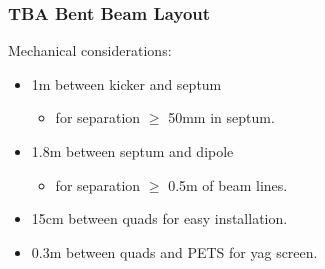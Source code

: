 \documentclass[professionalfonts,t]{beamer}
\begin{document}
\begin{frame}
	\frametitle{TBA Bent Beam Layout}
	\begin{tikzpicture}[scale=\textwidth/22cm, text=black]
	
	\end{tikzpicture}
	
	\vspace{-1em}
	Mechanical considerations:
	\begin{itemize}
		\item 1m between kicker and septum
		\begin{itemize}
			\item for separation $\ge$ 50mm in septum. 
		\end{itemize}
		\item 1.8m between septum and dipole
		\begin{itemize}
			\item for separation $\ge$ 0.5m of beam lines.
		\end{itemize}
		\item 15cm between quads for easy installation. 
		\item 0.3m between quads and PETS for yag screen.  
	\end{itemize}
\end{frame}
\iffalse
\end{document}
